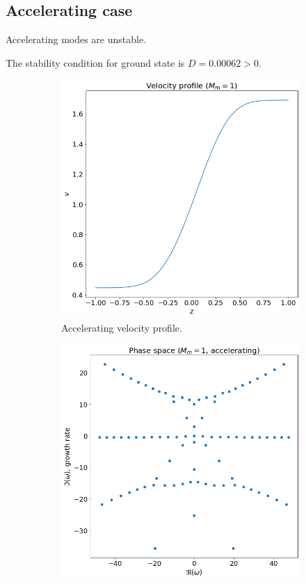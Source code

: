 \documentclass{article}
\theoremstyle{plain}
\theoremstyle{definition}
\theoremstyle{remark}
\theoremstyle{remark}
\begin{document}
\newpage
\subsection{Accelerating case}
Accelerating modes are unstable.

The stability condition for ground state is $D=0.00062>0$.

\begin{figure}[H]
    \centering
    \begin{subfigure}[b]{0.5\linewidth}
        \includegraphics[width=\linewidth]{img/velocity-profile-accelerating.png}
        \caption{Accelerating velocity profile.}
    \end{subfigure}%
    \begin{subfigure}[b]{0.5\linewidth}
        \includegraphics[width=\linewidth]{img/phase-space-accelerating.png}

\end{subfigure}
\end{figure}
\end{document}
